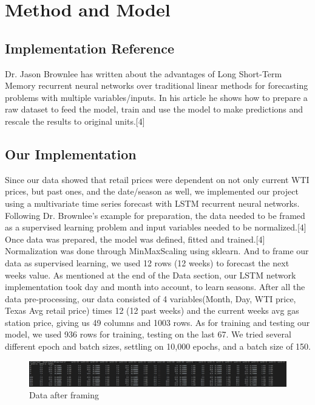 \documentclass[conference]{IEEEtran}
\begin{document}
\section{Method and Model}

\subsection{Implementation Reference}

Dr. Jason Brownlee has written about the advantages of Long Short-Term Memory recurrent neural networks over traditional linear methods for forecasting problems with multiple variables/inputs. In his article he shows how to prepare a raw dataset to feed the model, train and use the model to make predictions and rescale the results to original units.[4] 

\subsection{Our Implementation}

Since our data showed that retail prices were dependent on not only current WTI prices, but past ones, and the date/season as well, we implemented our project using a multivariate time series forecast with LSTM recurrent neural networks. Following Dr. Brownlee's example for preparation, the data needed to be framed as a supervised learning problem and input variables needed to be normalized.[4] Once data was prepared, the model was defined, fitted and trained.[4] Normalization was done through MinMaxScaling using sklearn. And to frame our data as supervised learning, we used 12 rows (12 weeks) to forecast the next weeks value. As mentioned at the end of the Data section, our LSTM network implementation took day and month into account, to learn seasons. After all the data pre-processing, our data consisted of 4 variables(Month, Day, WTI price, Texas Avg retail price) times 12 (12 past weeks) and the current weeks avg gas station price, giving us 49 columns and 1003 rows. As for training and testing our model, we used 936 rows for training, testing on the last 67. We tried several different epoch and batch sizes, settling on 10,000 epochs, and a batch size of 150.

\begin{figure}[htbp]
\includegraphics[width=.99\linewidth]{t12tot.png}
\caption{Data after framing}
\label{fig}
\end{figure}
\end{document}
